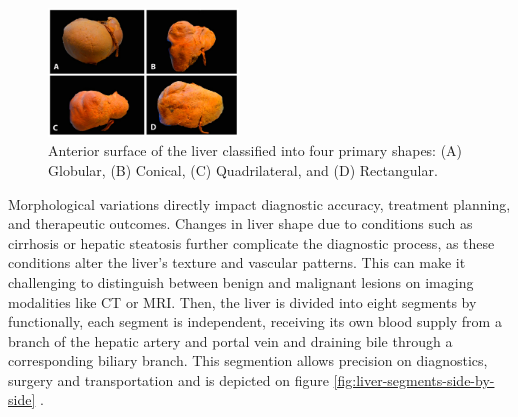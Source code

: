 \begin{figure}[H]
	\centering
	\includegraphics[width=0.45\textwidth]{assets/diagnostics-13-02371-g001.png} %
	\caption{Anterior surface of the liver classified into four primary shapes: (A) Globular, (B) Conical, (C) Quadrilateral, and (D) Rectangular.}
	\label{fig:liver-shapes}
\end{figure}

Morphological variations directly impact diagnostic accuracy, treatment planning, and therapeutic outcomes. Changes in liver shape due to conditions such as cirrhosis or hepatic steatosis further complicate the diagnostic process, as these conditions alter the liver’s texture and vascular patterns. This can make it challenging to distinguish between benign and malignant lesions on imaging modalities like CT or MRI. Then, the liver is divided into eight segments by functionally, each segment is independent, receiving its own blood supply from a branch of the hepatic artery and portal vein and draining bile through a corresponding biliary branch. This segmention allows precision on diagnostics, surgery and transportation and is depicted on figure \ref{fig:liver-segments-side-by-side} \cite{diagnostics13142371}.

